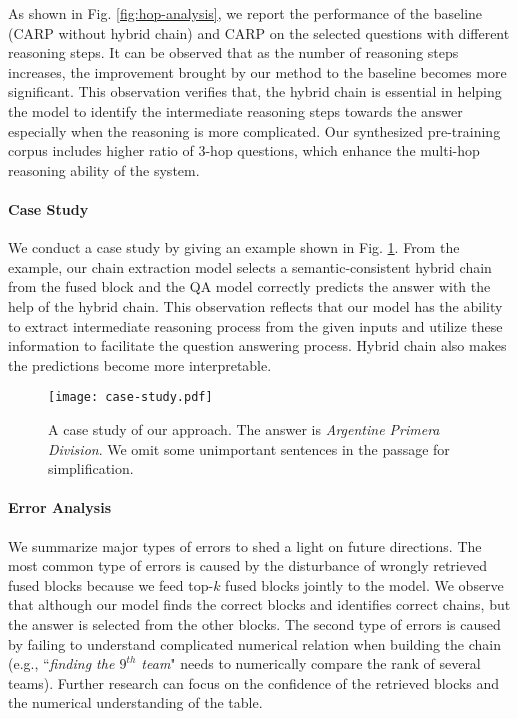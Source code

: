 \documentclass[11pt]{article}
\begin{document}
	As shown in Fig. \ref{fig:hop-analysis}, we report the performance of the baseline (CARP without hybrid chain) and CARP on the selected questions with different reasoning steps.
It can be observed that as the number of reasoning steps
increases, the improvement brought by our method to the baseline becomes more significant. 
	This observation verifies that, the hybrid chain is essential in helping the model to identify the intermediate reasoning steps towards the answer especially when the reasoning is more complicated. 
	Our synthesized pre-training corpus includes higher ratio of 3-hop questions, which enhance the multi-hop reasoning ability of the system.
	
\paragraph{Case Study} 
	We conduct a case study by giving an example shown in Fig. \ref{fig:case-study}. 
	From the example, our chain extraction model selects a semantic-consistent hybrid chain from the fused block and the QA model correctly predicts the answer with the help of the hybrid chain. 
	This observation reflects that our model has the ability to extract intermediate reasoning process from the given inputs and utilize these information to facilitate the question answering process.
	Hybrid chain also makes the predictions become more interpretable.
	
	\begin{figure}[t]
		\centering
		\texttt{[image: case-study.pdf]}
		\caption{A case study of our approach. The answer is \textit{Argentine Primera Division}. We omit some unimportant sentences in the passage for simplification.}
		\label{fig:case-study}
	\end{figure}
	\paragraph{Error Analysis}
	We summarize major types of errors to shed a light on future directions. 
	The most common type of errors is caused by the disturbance of  wrongly retrieved fused blocks because we feed top-$k$ fused blocks jointly to the model.
	We observe that although our model finds the correct blocks and identifies correct chains, but the answer is selected from the other blocks. 
	The second type of errors is caused by failing to understand complicated numerical relation when building the chain (e.g.,  ``\textit{finding the $9^{th}$ team}" needs to numerically compare the rank of several teams). 
	Further research can focus on the confidence of the retrieved blocks and the numerical understanding of the table.
	
\end{document}
